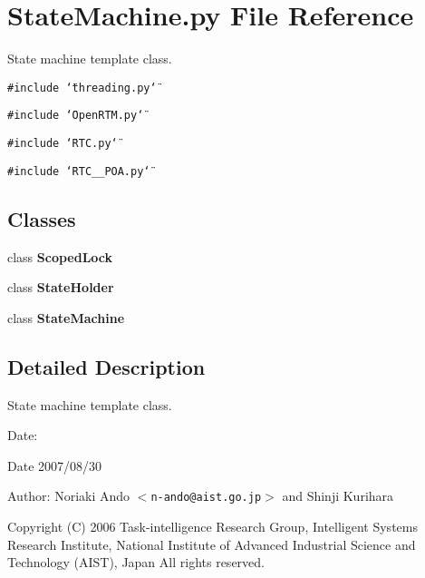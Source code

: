 \section{State\-Machine.py File Reference}
\label{StateMachine_8py}
State machine template class. 

{\tt \#include \char`\"{}threading.py\char`\"{}}\par
{\tt \#include \char`\"{}Open\-RTM.py\char`\"{}}\par
{\tt \#include \char`\"{}RTC.py\char`\"{}}\par
{\tt \#include \char`\"{}RTC\_\-\_\-POA.py\char`\"{}}\par
\subsection*{Classes}
\begin{CompactItemize}
\item 
class {\bf Scoped\-Lock}
\item 
class {\bf State\-Holder}
\item 
class {\bf State\-Machine}
\end{CompactItemize}


\subsection{Detailed Description}
State machine template class. 

\begin{Desc}
\item[Date:]\begin{Desc}
\item[Date]2007/08/30\end{Desc}
\end{Desc}
\begin{Desc}
\item[Author:]Noriaki Ando $<${\tt n-ando@aist.go.jp}$>$ and Shinji Kurihara\end{Desc}
Copyright (C) 2006 Task-intelligence Research Group, Intelligent Systems Research Institute, National Institute of Advanced Industrial Science and Technology (AIST), Japan All rights reserved.
